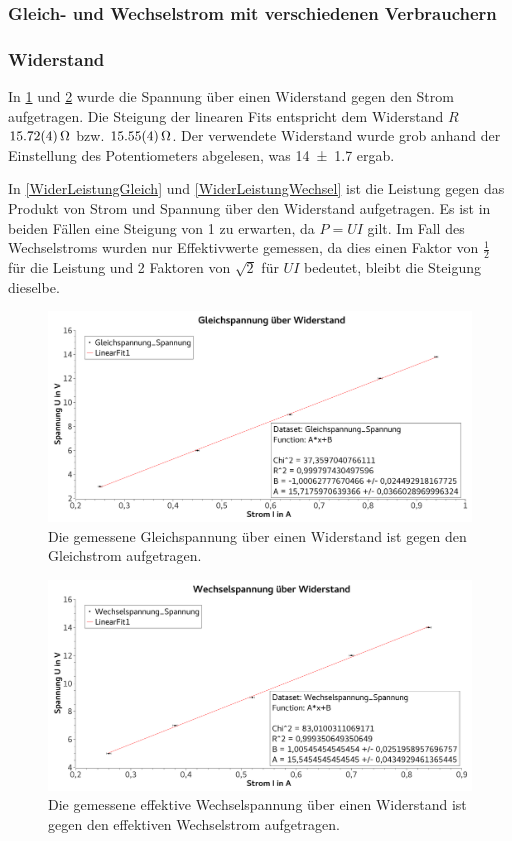 \documentclass[
	a4paper,
	12pt,
	pagesize,
	ngerman
]{scrartcl}
\begin{document}
	\subsubsection{Gleich- und Wechselstrom mit verschiedenen Verbrauchern}
	\subsubsection*{Widerstand}
	In \cref{WiderSpannungGleich} und \cref{WiderSpannungWechsel} wurde die Spannung über einen Widerstand gegen den Strom aufgetragen. 
	Die Steigung der linearen Fits entspricht dem Widerstand $R$ $\SI{15,72 \pm 0,04}{\Omega}$ bzw. $\SI{15,55 \pm 0,04}{\Omega}$. 
	Der verwendete Widerstand wurde grob anhand der Einstellung des Potentiometers abgelesen, was \SI{14 \pm 1,7}{\Omega} ergab.

	In \cref{WiderLeistungGleich} und \cref{WiderLeistungWechsel} ist die Leistung gegen das Produkt von Strom und Spannung über den Widerstand aufgetragen. Es ist in beiden Fällen eine Steigung von 1 zu erwarten, da $P = UI$ gilt. Im Fall des Wechselstroms wurden nur Effektivwerte gemessen, da dies einen Faktor von $\frac{1}{2}$ für die Leistung und 2 Faktoren von $\sqrt{2}$ für $UI$ bedeutet, bleibt die Steigung dieselbe.
	\begin{figure}[tb]
		\includegraphics[width=1\textwidth]{WiderSpannungGleich}
		\centering
		\caption{Die gemessene Gleichspannung über einen Widerstand ist gegen den Gleichstrom aufgetragen.}
		\label{WiderSpannungGleich}
		\centering
	\end{figure}
	\begin{figure}[tb]
		\includegraphics[width=1\textwidth]{WiderSpannungWechsel}
		\centering
		\caption{Die gemessene effektive Wechselspannung über einen Widerstand ist gegen den effektiven Wechselstrom aufgetragen.}
		\label{WiderSpannungWechsel}
		\centering
	\end{figure}
\end{document}
